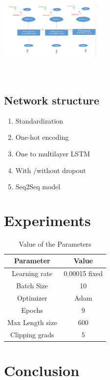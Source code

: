 \includegraphics[width=5cm,height=5cm]{Training_architecture.PNG}
\subsection{Network structure}
 
 \begin{enumerate}
 	\item Standardization
 	\item One-hot encoding
 	\item One to multilayer LSTM
 	\item With /without dropout
 	\item Seq2Seq model
 \end{enumerate}

\section{Experiments}

\begin{table}[]
	\centering
	\caption{Value of the Parameters }
	\label{my-label}
	\begin{tabular}{cc}
			Parameter& Value \\
		\hline
     	\hline
		Learning rate  &  0.00015 fixed    \\
		Batch Size  & 10 \\
		Optimizer  & Adam  \\
		Epochs  & 9 \\
		Max Length size  &  600 \\
		Clipping grads &  5\\
		\hline
	\end{tabular}
\end{table}

\section{Conclusion}

